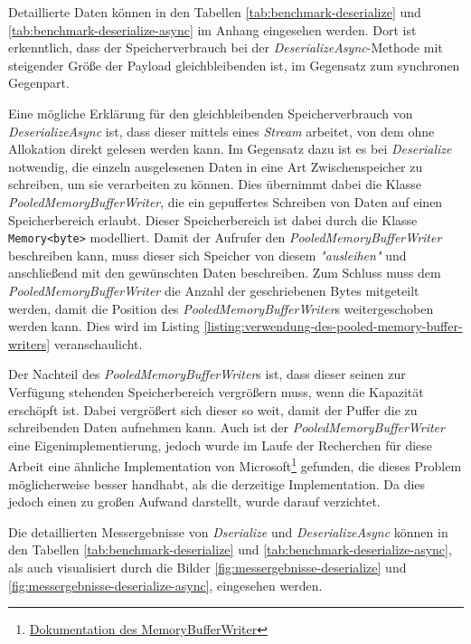 Detaillierte Daten können in den Tabellen \ref{tab:benchmark-deserialize} und \ref{tab:benchmark-deserialize-async} im Anhang eingesehen werden. Dort ist erkenntlich, dass der Speicherverbrauch bei der \textit{DeserializeAsync}-Methode mit steigender Größe der Payload gleichbleibenden ist, im Gegensatz zum synchronen Gegenpart.

Eine mögliche Erklärung für den gleichbleibenden Speicherverbrauch von \textit{DeserializeAsync} ist, dass dieser mittels eines \textit{Stream} arbeitet, von dem ohne Allokation direkt gelesen werden kann. Im Gegensatz dazu ist es bei \textit{Deserialize} notwendig, die einzeln ausgelesenen Daten in eine Art Zwischenspeicher zu schreiben, um sie verarbeiten zu können. Dies übernimmt dabei die Klasse \textit{PooledMemoryBufferWriter}, die ein gepuffertes Schreiben von Daten auf einen Speicherbereich erlaubt. Dieser Speicherbereich ist dabei durch die Klasse \texttt{Memory<byte>} modelliert. Damit der Aufrufer den \textit{PooledMemoryBufferWriter} beschreiben kann, muss dieser sich Speicher von diesem \textit{"ausleihen"} und anschließend mit den gewünschten Daten beschreiben. Zum Schluss muss dem \textit{PooledMemoryBufferWriter} die Anzahl der geschriebenen Bytes mitgeteilt werden, damit die Position des \textit{PooledMemoryBufferWriter}s weitergeschoben werden kann. Dies wird im Listing \ref{listing:verwendung-des-pooled-memory-buffer-writers} veranschaulicht.

Der Nachteil des \textit{PooledMemoryBufferWriter}s ist, dass dieser seinen zur Verfügung stehenden Speicherbereich vergrößern muss, wenn die Kapazität erschöpft ist. Dabei vergrößert sich dieser so weit, damit der Puffer die zu schreibenden Daten aufnehmen kann. Auch ist der \textit{PooledMemoryBufferWriter} eine Eigenimplementierung, jedoch wurde im Laufe der Recherchen für diese Arbeit eine ähnliche Implementation von Microsoft\footnote{\href{https://docs.microsoft.com/en-us/dotnet/api/microsoft.toolkit.highperformance.buffers.memorybufferwriter-1?view=win-comm-toolkit-dotnet-7.0}{Dokumentation des MemoryBufferWriter}} gefunden, die dieses Problem möglicherweise besser handhabt, als die derzeitige Implementation. Da dies jedoch einen zu großen Aufwand darstellt, wurde darauf verzichtet.

Die detaillierten Messergebnisse von \textit{Dserialize} und \textit{DeserializeAsync} können in den Tabellen \ref{tab:benchmark-deserialize} und \ref{tab:benchmark-deserialize-async}, als auch visualisiert durch die Bilder \ref{fig:messergebnisse-deserialize} und \ref{fig:messergebnisse-deserialize-async}, eingesehen werden.


